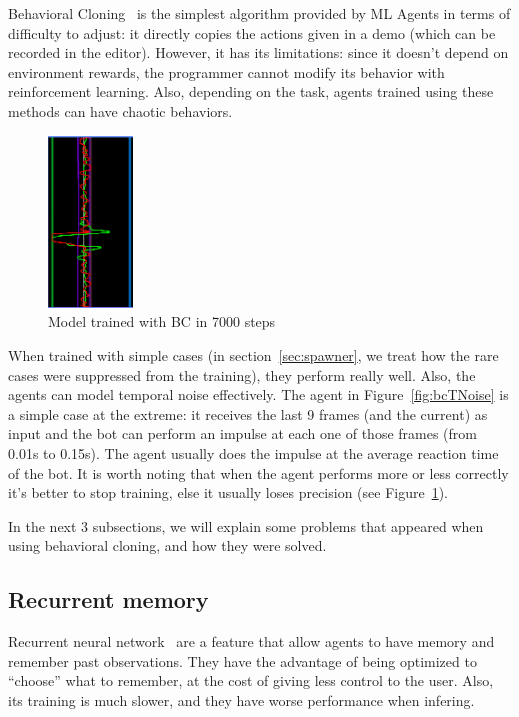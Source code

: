 Behavioral Cloning~\cite{Sammut2010} is the simplest algorithm provided by ML Agents in terms of difficulty to adjust: it directly copies the actions given in a demo (which can be recorded in the editor). However, it has its limitations: since it doesn't depend on environment rewards, the programmer cannot modify its behavior with reinforcement learning. Also, depending on the task, agents trained using these methods can have chaotic behaviors.

\begin{figure}
    \centering
    \includegraphics[width=0.2\textwidth]{img/bcTNovertrain.png}
		\caption{Model trained with BC in 7000 steps}
		\label{fig:bcTNovertrain}
\end{figure}

When trained with simple cases (in section~\ref{sec:spawner}, we treat how the rare cases were suppressed from the training), they perform really well. Also, the agents can model temporal noise effectively. The agent in Figure~\ref{fig:bcTNoise} is a simple case at the extreme: it receives the last 9 frames (and the current) as input and the bot can perform an impulse at each one of those frames (from 0.01s to 0.15s). The agent usually does the impulse at the average reaction time of the bot. It is worth noting that when the agent performs more or less correctly it's better to stop training, else it usually loses precision (see Figure~\ref{fig:bcTNovertrain}).

In the next 3 subsections, we will explain some problems that appeared when using behavioral cloning, and how they were solved.

\subsection{Recurrent memory} %

Recurrent neural network~\cite{zaremba2014recurrent} are a feature that allow agents to have memory and remember past observations. They have the advantage of being optimized to ``choose'' what to remember, at the cost of giving less control to the user. Also, its training is much slower, and they have worse performance when infering.

